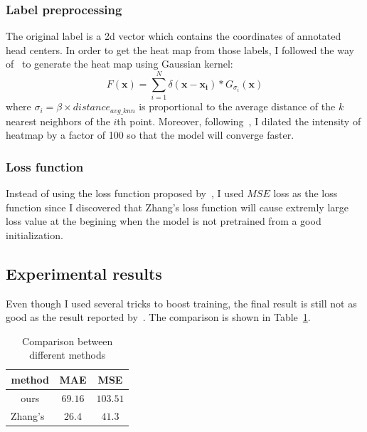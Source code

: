 \documentclass[10pt,twocolumn,letterpaper]{article}
\begin{document}
    \subsubsection{Label preprocessing}
    \par The original label is a 2d vector which contains the coordinates of annotated head centers.
    In order to get the heat map from those labels, I followed the way of~\cite{zhang2016single} to generate the heat map using Gaussian kernel:
    \begin{equation}
        \label{eq:heat_map}
        F(\mathbf{x}) = \sum_{i=1}^N\delta (\mathbf{x-x_i})*G_{\sigma_i}(\mathbf{x})
    \end{equation}
    where $\sigma_i=\beta\times distance_{avg\_knn}$ is proportional to the average distance of the $k$ nearest neighbors of the $i$th point.
    Moreover, following~\cite{wang2019learning,gao2019c}, I dilated the intensity of heatmap by a factor of 100 so that
    the model will converge faster.

    \subsubsection{Loss function}
    Instead of using the loss function proposed by~\cite{zhang2016single}, I used $MSE$ loss as the loss function since I discovered that Zhang's loss function
    will cause extremly large loss value at the begining when the model is not pretrained from a good initialization.

    \subsection{Experimental results}
    Even though I used several tricks to boost training, the final result is still not as good as the result reported by~\cite{zhang2016single}.
    The comparison is shown in Table~\ref{tab:CrowdCountingResult}.
    \begin{table}
        \begin{center}
            \caption{Comparison between different methods}
            \begin{tabular}{c c c}
                \hline
                method                         & MAE              & MSE              \\
                \hline
                ours                           & $ 69.16$         & $ 103.51$        \\
                Zhang's~\cite{zhang2016single} & $ \mathbf{26.4}$ & $ \mathbf{41.3}$ \\
                \hline
            \end{tabular}\label{tab:CrowdCountingResult}
        \end{center}
    \end{table}
\end{document}
